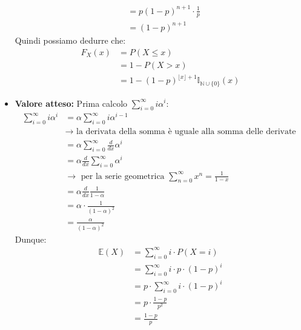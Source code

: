 \documentclass[11pt]{report}
\begin{document}
\begin{itemize}
\begin{equation}
\begin{split}
            & = p(1-p)^{n+1} \cdot \frac{1}{p}\\
            & = (1-p)^{n+1}
		\end{split}
    \end{equation}
    Quindi possiamo dedurre che:
    \begin{equation}
        \begin{split}
            F_X(x) & = P(X \leq x)\\
            & = 1 - P(X > x)\\
            & = 1 - (1-p)^{\lfloor x\rfloor + 1} \mathbb{I}_{\mathbb{N}\cup\{0\}}(x)
        \end{split}
    \end{equation}
    \item \textbf{Valore atteso:} Prima calcolo $\sum_{i=0}^\infty i \alpha^i$:
    \begin{equation}
    	\begin{split}
            \sum_{i=0}^\infty i \alpha^i & = \alpha \sum_{i=0}^\infty i \alpha^{i-1}\\
            & \rightarrow \text{ la derivata della somma è uguale alla somma delle derivate }\\
            & = \alpha \sum_{i=0}^\infty \frac{d}{dx} \alpha^{i}\\
            & = \alpha \frac{d}{dx} \sum_{i=0}^\infty \alpha^{i}\\
            & \rightarrow \text{ per la serie geometrica } \sum_{n=0}^\infty x^n = \frac{1}{1-x}\\
            & = \alpha \frac{d}{dx} \frac{1}{1 - \alpha}\\
            & = \alpha \cdot \frac{1}{(1-\alpha)^2}\\
            & = \frac{\alpha}{(1-\alpha)^2}
		\end{split}
    \end{equation}
    Dunque:
    \begin{equation}
    	\begin{split}
            \mathbb{E}(X) & = \sum_{i=0}^\infty i \cdot P(X=i)\\
            & = \sum_{i=0}^\infty i \cdot p \cdot (1-p)^i\\
            & = p \cdot \sum_{i=0}^\infty i \cdot (1-p)^i\\
            & = p \cdot \frac{1-p}{p^2}\\
            & = \frac{1-p}{p}
		\end{split}
    \end{equation}

\end{itemize}
\end{document}
